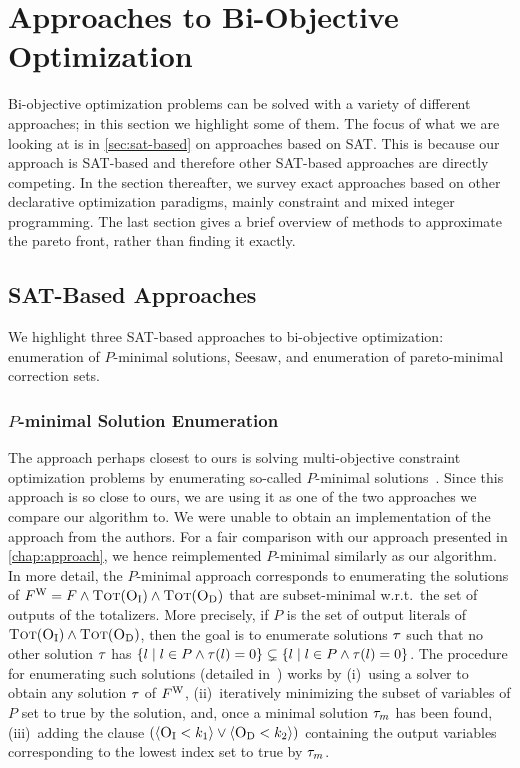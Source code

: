 \section{Approaches to Bi-Objective Optimization\label{sec:approaches}}

Bi-objective optimization problems can be solved with a variety of different approaches;
in this section we highlight some of them.
The focus of what we are looking at is in \cref{sec:sat-based} on approaches based on SAT.
This is because our approach is SAT-based and therefore other SAT-based approaches are directly competing.
In the section thereafter, we survey exact approaches based on other declarative optimization paradigms, mainly constraint and mixed integer programming.
The last section gives a brief overview of methods to approximate the pareto front, rather than finding it exactly.

\subsection{SAT-Based Approaches\label{sec:sat-based}}

We highlight three SAT-based approaches to bi-objective optimization:
enumeration of $P$-minimal solutions, Seesaw, and enumeration of pareto-minimal correction sets.

\subsubsection{$P$-minimal Solution Enumeration\label{sec:p-minimal}}

The approach perhaps closest to ours is solving multi-objective constraint optimization problems by enumerating so-called $P$-minimal solutions~\autocite{DBLP:conf/cp/SohBTB17,DBLP:conf/ftp/KoshimuraNFH09}.
Since this approach is so close to ours, we are using it as one of the two approaches we compare our algorithm to.
We were unable to obtain an implementation of the approach from the authors.
For a fair comparison with our approach presented in \cref{chap:approach}, we hence reimplemented $P$-minimal similarly as our algorithm.
In more detail, the $P$-minimal approach  corresponds to enumerating the solutions of $F^\text{W} = F \land \textsc{Tot}(\textsc{O}_{\text{I}}) \land \textsc{Tot}(\textsc{O}_{\text{D}})$ that are subset-minimal w.r.t.\ the set of outputs of the totalizers.
More precisely, if $P$ is the set of output literals of $\textsc{Tot}(\textsc{O}_{\text{I}}) \land \textsc{Tot}(\textsc{O}_{\text{D}})$, then the goal is to enumerate solutions $\tau$ such that no other solution $\tau$ has $\{ l \mid l \in P \land \tau(l) = 0\} \subsetneq \{ l \mid l \in P \land \tau(l) = 0\}$.
The procedure for enumerating such solutions (detailed in~\textcite{DBLP:conf/ftp/KoshimuraNFH09}) works by (i)~using a solver to obtain any solution $\tau$ of $F^\text{W}$, (ii)~iteratively minimizing the subset of variables of $P$ set to true by the solution, and, once a minimal solution $\tau_m$ has been found, (iii)~adding the clause $(\langle \textsc{O}_{\text{I}} < k_1 \rangle \lor \langle \textsc{O}_{\text{D}} < k_2 \rangle)$ containing the output variables corresponding to the lowest index set to true by $\tau_m$.

